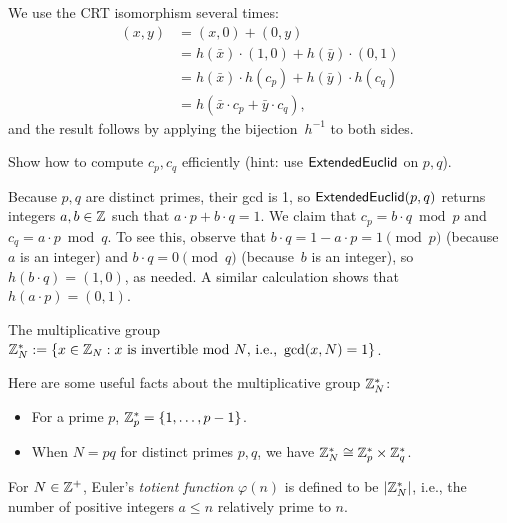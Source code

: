 \documentclass[11pt]{article}
\begin{document}
\begin{answer}
  We use the CRT isomorphism several times:
  \begin{align*}
    (x,y) &= (x, 0) + (0, y) \\
          &= h(\bar{x}) \cdot (1,0) + h(\bar{y}) \cdot (0,1) \\
          &= h(\bar{x}) \cdot h(c_p) + h(\bar{y}) \cdot h(c_q) \\
          &= h(\bar{x} \cdot c_p + \bar{y} \cdot c_q),
  \end{align*}
  and the result follows by applying the bijection~$h^{-1}$ to both
  sides.
\end{answer}

\begin{question}
  Show how to compute $c_{p}, c_{q}$ efficiently (hint: use
  $\mathsf{ExtendedEuclid}$ on $p,q$).
\end{question}

\begin{answer}
  Because $p,q$ are distinct primes, their gcd is 1, so
  $\mathsf{ExtendedEuclid}(p,q)$ returns integers $a,b \in \mathbb{Z}$ such that
  $a \cdot p + b \cdot q = 1$. We claim that
  $c_{p} = b \cdot q \bmod{p}$ and $c_{q} = a \cdot p \bmod{q}$. To
  see this, observe that $b \cdot q = 1 - a \cdot p = 1 \pmod{p}$
  (because~$a$ is an integer) and $b \cdot q = 0 \pmod{q}$
  (because~$b$ is an integer), so $h(b \cdot q) = (1,0)$, as needed. A
  similar calculation shows that $h(a \cdot p) = (0,1)$.
\end{answer}

\begin{definition}
  The multiplicative group $\mathbb{Z}_N^{*} := \{ x \in \mathbb{Z}_N : x \text{
      is invertible mod $N$, i.e., } \gcd(x,N) = 1 \}$.
\end{definition}

\noindent Here are some useful facts about the multiplicative group
$\mathbb{Z}_N^{*}$:
\begin{itemize}
\item For a prime $p$, $\mathbb{Z}_p^{*} = \{1, \ldots, p-1\}$.
\item When $N=pq$ for distinct primes $p,q$, we have $\mathbb{Z}^{*}_N \cong
  \mathbb{Z}_p^{*} \times \mathbb{Z}_q^{*}$.
\end{itemize}

\begin{definition}
  For $N \in \mathbb{Z}^+$, Euler's \emph{totient function} $\varphi(n)$ is
  defined to be $\lvert\mathbb{Z}_N^{*}\rvert$, i.e., the number of positive integers
  $a \leq n$ relatively prime to $n$.
\end{definition}
\end{document}
